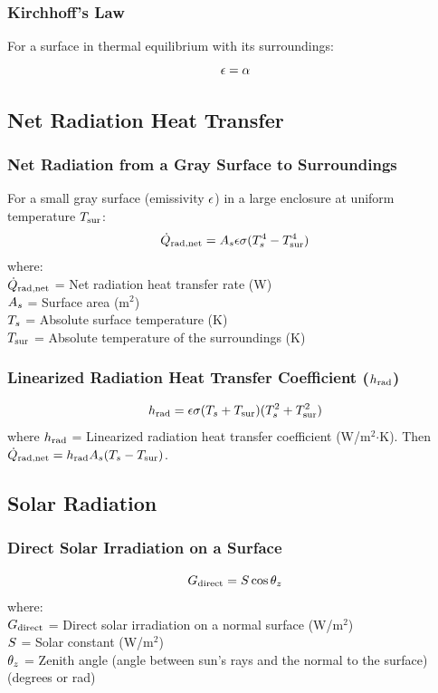 \subsubsection*{Kirchhoff's Law}
For a surface in thermal equilibrium with its surroundings:
\begin{equation}
    \epsilon = \alpha
\end{equation}

\subsection{Net Radiation Heat Transfer}
\subsubsection*{Net Radiation from a Gray Surface to Surroundings}
For a small gray surface (emissivity $\epsilon$) in a large enclosure at uniform temperature $T_{\text{sur}}$:
\begin{equation}
    \dot{Q}_{\text{rad,net}} = A_s \epsilon \sigma (T_s^4 - T_{\text{sur}}^4)
\end{equation}
where: \\
$\dot{Q}_{\text{rad,net}}$ = Net radiation heat transfer rate (W) \\
$A_s$ = Surface area (m$^2$) \\
$T_s$ = Absolute surface temperature (K) \\
$T_{\text{sur}}$ = Absolute temperature of the surroundings (K)

\subsubsection*{Linearized Radiation Heat Transfer Coefficient ($h_{\text{rad}}$)}
\begin{equation}
    h_{\text{rad}} = \epsilon \sigma (T_s + T_{\text{sur}})(T_s^2 + T_{\text{sur}}^2)
\end{equation}
where $h_{\text{rad}}$ = Linearized radiation heat transfer coefficient (W/m$^2$$\cdot$K).
Then $\dot{Q}_{\text{rad,net}} = h_{\text{rad}} A_s (T_s - T_{\text{sur}})$.

\subsection{Solar Radiation}
\subsubsection*{Direct Solar Irradiation on a Surface}
\begin{equation}
    G_{\text{direct}} = S \cos \theta_z
\end{equation}
where: \\
$G_{\text{direct}}$ = Direct solar irradiation on a normal surface (W/m$^2$) \\
$S$ = Solar constant (W/m$^2$) \\
$\theta_z$ = Zenith angle (angle between sun's rays and the normal to the surface) (degrees or rad)

